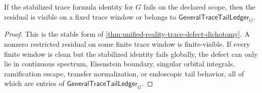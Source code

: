 \begin{theorem}
\label{thm:unified-reality-general-g-stabilized-trace-residual-dichotomy}
If the stabilized trace formula identity for $G$ fails on the declared
scope, then the residual is visible on a fixed trace window or belongs
to $\mathsf{GeneralTraceTailLedger}_G$.
\end{theorem}
\begin{proof}
This is the stable form of
\autoref{thm:unified-reality-trace-defect-dichotomy}. A nonzero
restricted residual on some finite trace window is finite-visible. If
every finite window is clean but the stabilized identity fails globally,
the defect can only lie in continuous spectrum, Eisenstein boundary,
singular orbital integrals, ramification escape, transfer
normalization, or endoscopic tail behavior, all of which are entries of
$\mathsf{GeneralTraceTailLedger}_G$.
\end{proof}

